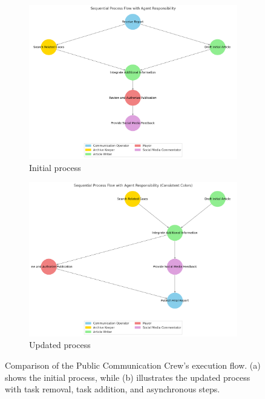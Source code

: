 \begin{figure}[htbp]
    \centering
    \begin{subfigure}[b]{0.45\textwidth}
        \centering
        \includegraphics[width=\textwidth]{figures/PC-process.png}
        \caption{Initial process}
        \label{fig:initial_process}
    \end{subfigure}
    \hfill
    \begin{subfigure}[b]{0.45\textwidth}
        \centering
        \includegraphics[width=\textwidth]{figures/PC-process-updated.png}
        \caption{Updated process}
        \label{fig:updated_process}
    \end{subfigure}
    \caption{Comparison of the Public Communication Crew's execution flow. (a) shows the initial process, while (b) illustrates the updated process with task removal, task addition, and asynchronous steps.}
    \label{fig:exc_flow_pc_comparison}
\end{figure}

